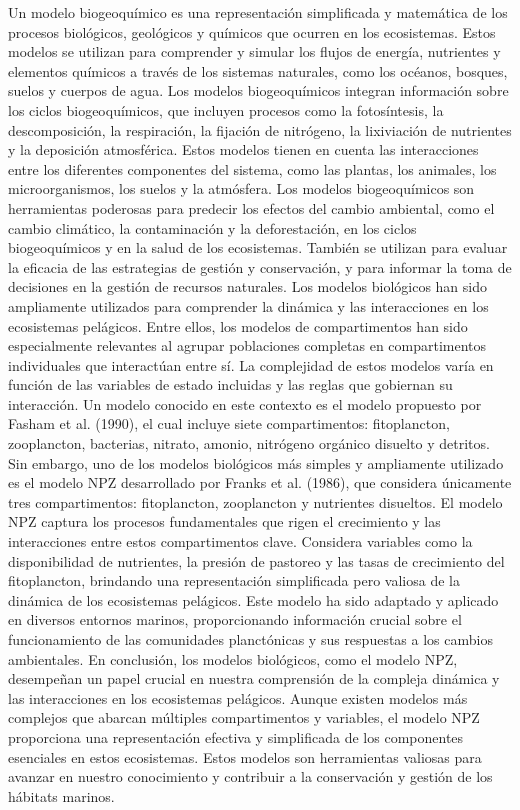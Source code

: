 \documentclass{article}
\begin{document}
\begin{abstract .}
Un modelo biogeoquímico es una representación simplificada y matemática de los procesos biológicos, geológicos y químicos que ocurren en los ecosistemas. Estos modelos se utilizan para comprender y simular los flujos de energía, nutrientes y elementos químicos a través de los sistemas naturales, como los océanos, bosques, suelos y cuerpos de agua.
Los modelos biogeoquímicos integran información sobre los ciclos biogeoquímicos, que incluyen procesos como la fotosíntesis, la descomposición, la respiración, la fijación de nitrógeno, la lixiviación de nutrientes y la deposición atmosférica. Estos modelos tienen en cuenta las interacciones entre los diferentes componentes del sistema, como las plantas, los animales, los microorganismos, los suelos y la atmósfera.
Los modelos biogeoquímicos son herramientas poderosas para predecir los efectos del cambio ambiental, como el cambio climático, la contaminación y la deforestación, en los ciclos biogeoquímicos y en la salud de los ecosistemas. También se utilizan para evaluar la eficacia de las estrategias de gestión y conservación, y para informar la toma de decisiones en la gestión de recursos naturales.
Los modelos biológicos han sido ampliamente utilizados para comprender la dinámica y las interacciones en los ecosistemas pelágicos. Entre ellos, los modelos de compartimentos han sido especialmente relevantes al agrupar poblaciones completas en compartimentos individuales que interactúan entre sí. La complejidad de estos modelos varía en función de las variables de estado incluidas y las reglas que gobiernan su interacción.
Un modelo conocido en este contexto es el modelo propuesto por Fasham et al. (1990), el cual incluye siete compartimentos: fitoplancton, zooplancton, bacterias, nitrato, amonio, nitrógeno orgánico disuelto y detritos. Sin embargo, uno de los modelos biológicos más simples y ampliamente utilizado es el modelo NPZ desarrollado por Franks et al. (1986), que considera únicamente tres compartimentos: fitoplancton, zooplancton y nutrientes disueltos.
El modelo NPZ captura los procesos fundamentales que rigen el crecimiento y las interacciones entre estos compartimentos clave. Considera variables como la disponibilidad de nutrientes, la presión de pastoreo y las tasas de crecimiento del fitoplancton, brindando una representación simplificada pero valiosa de la dinámica de los ecosistemas pelágicos. Este modelo ha sido adaptado y aplicado en diversos entornos marinos, proporcionando información crucial sobre el funcionamiento de las comunidades planctónicas y sus respuestas a los cambios ambientales.
En conclusión, los modelos biológicos, como el modelo NPZ, desempeñan un papel crucial en nuestra comprensión de la compleja dinámica y las interacciones en los ecosistemas pelágicos. Aunque existen modelos más complejos que abarcan múltiples compartimentos y variables, el modelo NPZ proporciona una representación efectiva y simplificada de los componentes esenciales en estos ecosistemas. Estos modelos son herramientas valiosas para avanzar en nuestro conocimiento y contribuir a la conservación y gestión de los hábitats marinos.



\end{abstract .}
\end{document}
